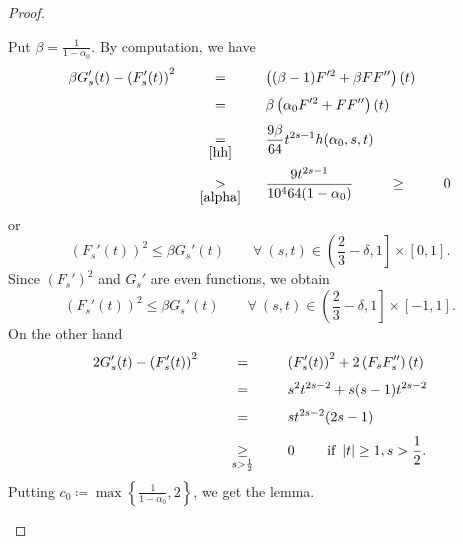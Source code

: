 \documentclass[11pt, a4paper]{article}
\numberwithin{equation}{section}
\newcommand{\coex}[2][\hphantom{longexplanation}]{%
  \underset{{#1}}{\overset{\hphantom{longexplanation}}{#2}}
}
\newcommand{\abs}[1]{\left\lvert #1\right\rvert}
\begin{document}
\begin{proof}
\begin{description}[wide]
\item[Step 5.] Put $\beta=\frac{1}{1-\alpha_{0}}$. By computation, we
  have 
  \begin{align*}
    \beta G_{s}'(t)-\left(F_{s}'(t) \right)^{2}
    &\coex{=} \left((\beta-1)F'^{2}+ \beta FF'' \right)(t)\\
    &\coex{=} \beta \left(\alpha_{0} F'^{2}+ FF'' \right)(t)\\
    &\coex[\eqref{hh}]{=}
      \frac{9\beta}{64}t^{2s-1}h(\alpha_{0},s,t)\\
    &\coex[\eqref{alpha}]{>}\frac{9 t^{2s-1}}{10^{4}64(1-\alpha_{0})}
      \coex{\ge} 0
  \end{align*}
  or
  \[
  \left(F_{s}'(t) \right)^{2}\le \beta G_{s}'(t)\qquad\forall~(s,t)\in \left(\frac{2}{3}-\delta,1 \right]\times [0,1].\]
Since $\left( F_s' \right)^2$ and $G_s'$ are even functions, we obtain
\[
  \left(F_{s}'(t) \right)^{2}\le \beta G_{s}'(t)\qquad\forall~(s,t)\in \left(\frac{2}{3}-\delta,1 \right]\times [-1,1].\]
 On the other hand
\begin{align*}
  2G_s'(t)- \left(F_s'(t) \right)^{2}
  &\coex{=} \left(F_s'(t) \right)^{2}+2\left(F_sF_s'' \right)(t)\\
  &\coex{=} s^{2}t^{2s-2}+ s(s-1)t^{2s-2}\\
  &\coex{=} st^{2s-2}(2s-1)\\
  &\coex[s > \frac{1}{2}]{\ge} 0 \qquad \text{ if } \abs{t} \ge 1, s> \frac{1}{2}.
\end{align*}
Putting  $c_{0}\coloneqq \max \left\{\frac{1}{1-\alpha_{0}},2\right\}$, we get the lemma.
\end{description}
\end{proof}
\end{document}
